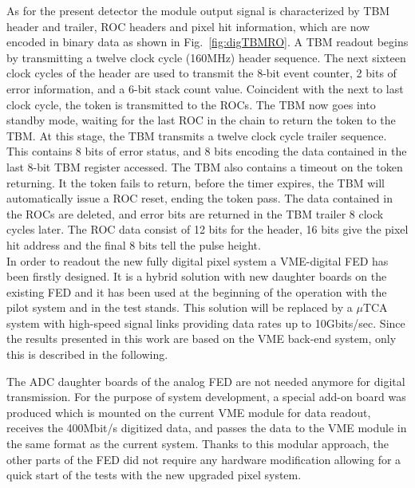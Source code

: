 As for the present detector the module output signal is characterized by TBM header and trailer, ROC headers and pixel hit information, which are now encoded in binary data as shown in Fig.~\ref{fig:digTBMRO}.
A TBM readout begins by transmitting a twelve clock cycle (160\unit{MHz}) header sequence.
The next sixteen clock cycles of the header are used to transmit the 8-bit event counter, 2 bits of error information, and a 6-bit stack count value.
Coincident with the next to last clock cycle, the token is transmitted to the ROCs. The TBM now goes into standby mode, waiting for the last ROC in the chain to return the token to the TBM.
At this stage, the TBM transmits a twelve clock cycle trailer sequence. This contains 8 bits of error status, and 8 bits encoding the data contained in the last 8-bit TBM register accessed.
The TBM also contains a timeout on the token returning. It the token fails to return, before the timer expires, the TBM will automatically issue a ROC reset, ending the token pass.
The data contained in the ROCs are deleted, and error bits are returned in the TBM trailer 8 clock cycles later.
The ROC data consist of 12 bits for the header, 16 bits give the pixel hit address and the final 8 bits tell the pulse height.\\

In order to readout the new fully digital pixel system a VME-digital FED has been firstly designed.
It is a hybrid solution with new daughter boards on the existing FED and it has been used at the beginning of the operation with the pilot system and in the test stands.
This solution will be replaced by a $\mu$TCA system with high-speed signal links providing data rates up to 10\unit{Gbits/sec}. 
Since the results presented in this work are based on the VME back-end system, only this is described in the following.

The ADC daughter boards of the analog FED are not needed anymore for digital transmission.
For the purpose of system development, a special add-on board was produced which is mounted on the current VME module for data readout, receives the 400\unit{Mbit/s} digitized data, and passes the data to the VME module in the same format as the current system.
Thanks to this modular approach, the other parts of the FED did not require any hardware modification allowing for a quick start of the tests with the new upgraded pixel system.

